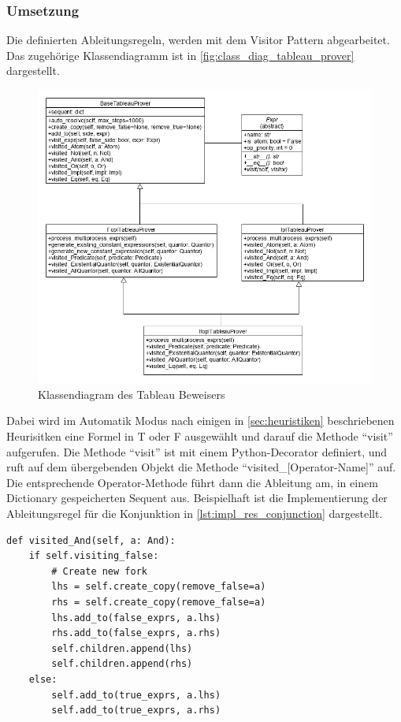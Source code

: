 \subsubsection{Umsetzung}
Die definierten Ableitungsregeln, werden mit dem Visitor Pattern abgearbeitet. \cite{gof_design_patterns} Das zugehörige Klassendiagramm ist in \autoref{fig:class_diag_tableau_prover} dargestellt.

\begin{figure}[h]
\begin{center}
\includegraphics[scale=0.55]{images/class_diag_tableau_prover.png}
\caption{Klassendiagram des Tableau Beweisers}
\label{fig:class_diag_tableau_prover}
\end{center}
\end{figure}

Dabei wird im Automatik Modus nach einigen in \autoref{sec:heuristiken} beschriebenen Heurisitken eine Formel in T oder F ausgewählt und darauf die Methode ``visit'' aufgerufen. Die Methode ``visit'' ist mit einem Python-Decorator definiert, und ruft auf dem übergebenden Objekt die Methode ``visited\_[Operator-Name]'' auf. Die entsprechende Operator-Methode führt dann die Ableitung am, in einem Dictionary gespeicherten Sequent aus. Beispielhaft ist die Implementierung der Ableitungsregel für die Konjunktion in \autoref{lst:impl_res_conjunction} dargestellt.

\begin{lstlisting}[caption={Implementierung der Ableitungsregel für die Konjunktion in Aussagenlogik},label=lst:impl_res_conjunction]
def visited_And(self, a: And):
	if self.visiting_false:
		# Create new fork
		lhs = self.create_copy(remove_false=a)
		rhs = self.create_copy(remove_false=a)
		lhs.add_to(false_exprs, a.lhs)
		rhs.add_to(false_exprs, a.rhs)
		self.children.append(lhs)
		self.children.append(rhs)
	else:
		self.add_to(true_exprs, a.lhs)
		self.add_to(true_exprs, a.rhs)
\end{lstlisting}


